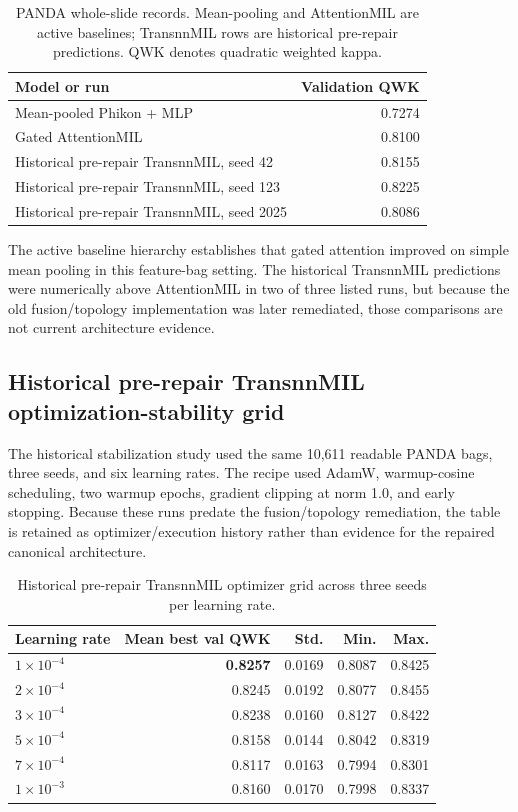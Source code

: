 \begin{table}[!htbp]
\centering
\caption{PANDA whole-slide records. Mean-pooling and AttentionMIL are active baselines; TransnnMIL rows are historical pre-repair predictions. QWK denotes quadratic weighted kappa.}
\small
\begin{tabular}{lr}
\toprule
Model or run & Validation QWK \\
\midrule
Mean-pooled Phikon + MLP & 0.7274 \\
Gated AttentionMIL & 0.8100 \\
Historical pre-repair TransnnMIL, seed 42 & 0.8155 \\
Historical pre-repair TransnnMIL, seed 123 & 0.8225 \\
Historical pre-repair TransnnMIL, seed 2025 & 0.8086 \\
\bottomrule
\end{tabular}
\label{tab:panda_model_hierarchy}
\end{table}
\FloatBarrier

The active baseline hierarchy establishes that gated attention improved on simple mean pooling in this feature-bag setting. The historical TransnnMIL predictions were numerically above AttentionMIL in two of three listed runs, but because the old fusion/topology implementation was later remediated, those comparisons are not current architecture evidence.

\subsection{Historical pre-repair TransnnMIL optimization-stability grid}
The historical stabilization study used the same 10,611 readable PANDA bags, three seeds, and six learning rates. The recipe used AdamW, warmup-cosine scheduling, two warmup epochs, gradient clipping at norm 1.0, and early stopping. Because these runs predate the fusion/topology remediation, the table is retained as optimizer/execution history rather than evidence for the repaired canonical architecture.

\begin{table}[!htbp]
\centering
\caption{Historical pre-repair TransnnMIL optimizer grid across three seeds per learning rate.}
\small
\begin{tabular}{lrrrr}
\toprule
Learning rate & Mean best val QWK & Std. & Min. & Max. \\
\midrule
$1\times10^{-4}$ & \textbf{0.8257} & 0.0169 & 0.8087 & 0.8425 \\
$2\times10^{-4}$ & 0.8245 & 0.0192 & 0.8077 & 0.8455 \\
$3\times10^{-4}$ & 0.8238 & 0.0160 & 0.8127 & 0.8422 \\
$5\times10^{-4}$ & 0.8158 & 0.0144 & 0.8042 & 0.8319 \\
$7\times10^{-4}$ & 0.8117 & 0.0163 & 0.7994 & 0.8301 \\
$1\times10^{-3}$ & 0.8160 & 0.0170 & 0.7998 & 0.8337 \\
\bottomrule
\end{tabular}
\label{tab:transnnmil_stability_full}
\end{table}
\FloatBarrier

